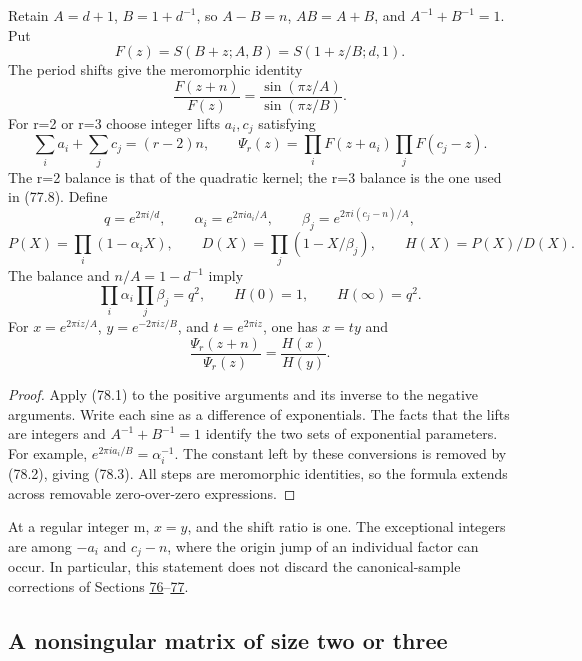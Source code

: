 \documentclass[11pt,reqno]{amsart}
\theoremstyle{plain}
\begin{document}
Retain \(A=d+1\), \(B=1+d^{-1}\), so
\(A-B=n\), \(AB=A+B\), and \(A^{-1}+B^{-1}=1\).
Put
\[
 F(z)=S(B+z;A,B)=S(1+z/B;d,1).
\]
The period shifts give the meromorphic identity
\begin{equation*}
 \frac{F(z+n)}{F(z)}
 =\frac{\sin(\pi z/A)}{\sin(\pi z/B)}.
 \tag{78.1}
\end{equation*}
For r=2 or r=3 choose integer lifts \(a_i,c_j\) satisfying
\[
 \sum_i a_i+\sum_jc_j=(r-2)n,
 \qquad
 \Psi_r(z)=\prod_iF(z+a_i)\prod_jF(c_j-z).
\]
The r=2 balance is that of the quadratic kernel; the r=3 balance
is the one used in (77.8). Define
\[
 q=e^{2\pi i/d},\qquad
 \alpha_i=e^{2\pi ia_i/A},\qquad
 \beta_j=e^{2\pi i(c_j-n)/A},
\]
\[
 P(X)=\prod_i(1-\alpha_iX),\qquad
 D(X)=\prod_j(1-X/\beta_j),\qquad H(X)=P(X)/D(X).
\]
The balance and \(n/A=1-d^{-1}\) imply
\begin{equation*}
 \prod_i\alpha_i\prod_j\beta_j=q^2,
 \qquad H(0)=1,\qquad H(\infty)=q^2.
 \tag{78.2}
\end{equation*}
For \(x=e^{2\pi iz/A}\), \(y=e^{-2\pi iz/B}\), and
\(t=e^{2\pi iz}\), one has \(x=ty\) and
\begin{equation*}
 \boxed{\displaystyle
 \frac{\Psi_r(z+n)}{\Psi_r(z)}=\frac{H(x)}{H(y)}.}
 \tag{78.3}
\end{equation*}

\begin{proof}
Apply (78.1) to the positive arguments and its inverse
to the negative arguments. Write each sine as a difference of
exponentials. The facts that the lifts are integers and
\(A^{-1}+B^{-1}=1\) identify the two sets of exponential
parameters. For example,
\(e^{2\pi ia_i/B}=\alpha_i^{-1}\).
The constant left by these conversions is removed by (78.2),
giving (78.3). All steps are meromorphic identities, so the
formula extends across removable zero-over-zero expressions.
\end{proof}

At a regular integer m, \(x=y\), and the shift ratio is one.
The exceptional integers are among \(-a_i\) and \(c_j-n\),
where the origin jump of an individual factor can occur. In
particular, this statement does not discard the canonical-sample
corrections of Sections \hyperref[sec:76]{76}--\hyperref[sec:77]{77}.

\subsection{A nonsingular matrix of size two or three}\label{sec:78.2}
\end{document}

